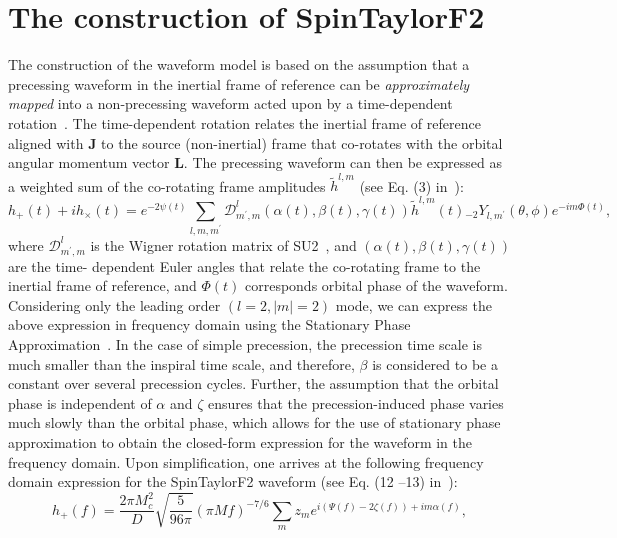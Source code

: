 \section{The construction of SpinTaylorF2}

The construction of the waveform model is based on the assumption that a
precessing waveform in the inertial frame of reference can be
\textit{approximately mapped} into a non-precessing waveform acted upon by a
time-dependent rotation~\cite{Schmidt2012,Boyle2011, Rotation}. The 
time-dependent rotation relates the inertial frame of reference aligned with
$\mathbf{J}$ to the source (non-inertial) frame that co-rotates with the orbital
angular momentum vector $\mathbf{L}$. The precessing waveform can then be
expressed as a weighted sum of the co-rotating frame amplitudes
$\tilde{h}^{l,m}$ (see Eq. (3) in~\cite{Lundgren2014}):
\begin{equation}   
h_{+}(t) + i h_{\times}(t) = e^{-2 \psi(t)}
\sum_{l,m,m^{\prime}} \mathcal{D}^{l}_{m^{\prime},m} \left(\alpha(t), \beta(t), \gamma(t)\right)
\tilde{h}^{l,m}(t){}_{-2}Y_{l,m^{\prime}}\left(\theta,\phi\right)e^{-i m \Phi(t)},
\end{equation}   
where $\mathcal{D}^{l}_{m^{\prime},m}$ is the Wigner rotation matrix of
SU2~\cite{Boyle2011}, and $(\alpha(t), \beta(t), \gamma(t))$ are the time-
dependent Euler angles that relate the co-rotating frame to the inertial frame
of reference, and $\Phi(t)$ corresponds orbital phase of the waveform.
Considering only the leading order $(l=2, |m| = 2)$ mode, we can express the
above expression in frequency domain using the Stationary Phase
Approximation~\cite{Lundgren2014, Creighton}. In the case of simple
precession, the precession time scale is much smaller than the inspiral time
scale, and therefore, $\beta$ is considered to be a constant over several
precession cycles. Further, the assumption that the orbital phase is
independent of $\alpha$ and $\zeta$ ensures that the
precession-induced phase varies much slowly than the orbital phase, which
allows for the use of stationary phase approximation to obtain the closed-form
expression for the waveform in the frequency domain. Upon simplification, one
arrives at the following frequency domain expression for the SpinTaylorF2
waveform (see Eq. (12 --13) in~\cite{Lundgren2014}):
\begin{equation}  
\label{STF2_main} 
h_{+}(f) =
\dfrac{2\pi M_{c}^{2}}{D}\sqrt{\dfrac{5}{96\pi}}(\pi M
f)^{-7/6}\sum_{m}z_{m}e^{i(\Psi(f) - 2\zeta(f)) + i m \alpha(f)},
\end{equation} 

